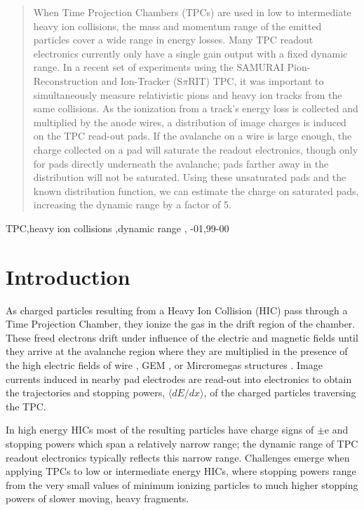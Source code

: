 \documentclass[review]{elsarticle}
\begin{document}
\begin{frontmatter}
\begin{abstract}

When Time Projection Chambers (TPCs) are used in low to intermediate heavy ion collisions, the mass and momentum range of the emitted particles cover a wide range in energy losses. Many TPC readout electronics currently only have a single gain output with a fixed dynamic range. In a recent set of experiments using the SAMURAI Pion-Reconstruction and Ion-Tracker (S$\pi$RIT) TPC, it was important to simultaneously measure relativistic pions and heavy ion tracks from the same collisions. As the ionization from a track's energy loss is collected and multiplied by the anode wires, a distribution of image charges is induced on the TPC read-out pads. If the avalanche on a wire is large enough, the charge collected on a pad will saturate the readout electronics, though only for pads directly underneath the avalanche; pads farther away in the distribution will not be saturated. Using these unsaturated pads and the known distribution function, we can estimate the charge on saturated pads, increasing the dynamic range by a factor of 5.

\end{abstract}

\begin{keyword}
TPC\sep heavy ion collisions \sep dynamic range \sep 
{}-01\sep  99-00
\end{keyword}

\end{frontmatter}

\linenumbers


\section{Introduction} 

As charged particles resulting from a Heavy Ion Collision (HIC) pass through a Time Projection Chamber, they ionize the gas in the drift region of the chamber. These freed electrons drift under influence of the electric and magnetic fields until they arrive at the avalanche region where they are multiplied in the presence of the high electric fields of wire \cite{blumrol}, GEM \cite{gem}, or Mircromegas structures \cite{micromeg}. Image currents induced in nearby pad electrodes are read-out into electronics to obtain the trajectories and stopping powers, $\langle dE/dx\rangle$, of the charged particles traversing the TPC.

In high energy HICs most of the resulting particles have charge signs of $\pm$e and stopping powers which span a relatively narrow range; the dynamic range of TPC readout electronics typically reflects this narrow range. Challenges emerge when applying TPCs to low or intermediate energy HICs, where stopping powers range from the very small values of minimum ionizing particles to much higher stopping powers of slower moving, heavy fragments. 
\end{document}
